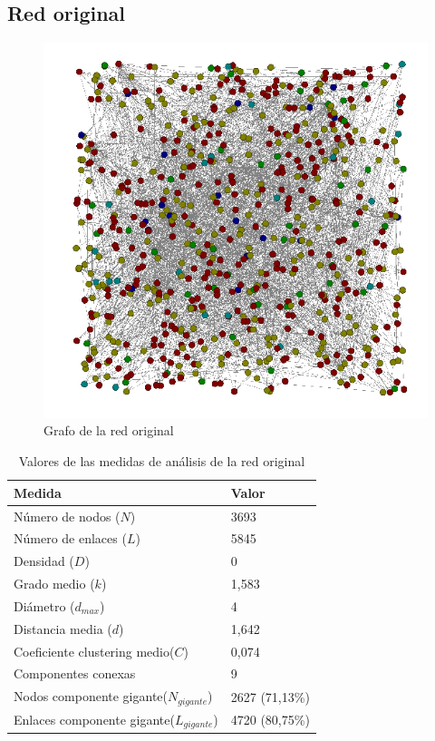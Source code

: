 \subsection{Red original}

\begin{figure}[H]
	\centering
	\includegraphics[width=12cm]{../images/original-graph}
	\caption{Grafo de la red original}
\end{figure}

\begin{table}[H]
	\centering
	\caption{Valores de las medidas de análisis de la red original}
	\label{tab:medidas-original}
	\begin{tabular}{| l | l |}
		\hline
		Medida                							& Valor          \\ 
		\hline
		Número de nodos ($N$)           					& 3693           \\
		Número de enlaces ($L$)                   		& 5845           \\
		Densidad ($D$)                   				& 0         \\
		Grado medio ($k$)                   				& 1,583          \\
		Diámetro ($d_{max}$)             				& 4              \\
		Distancia media ($d$)                   			& 1,642          \\
		Coeficiente clustering medio($C$)              	& 0,074          \\
		Componentes conexas   							& 9            \\ 
		Nodos componente gigante($N_{gigante}$)        	& 2627 (71,13\%) \\ 
		Enlaces componente gigante($L_{gigante}$)       & 4720 (80,75\%) \\ 
		\hline
	\end{tabular}
\end{table}

